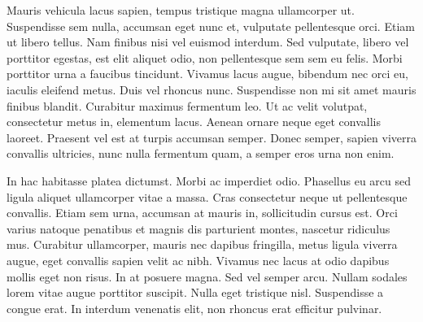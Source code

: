 \documentclass{article}
\begin{document}
Mauris vehicula lacus sapien, tempus tristique magna ullamcorper ut. Suspendisse sem nulla, accumsan eget nunc et, vulputate pellentesque orci. Etiam ut libero tellus. Nam finibus nisi vel euismod interdum. Sed vulputate, libero vel porttitor egestas, est elit aliquet odio, non pellentesque sem sem eu felis. Morbi porttitor urna a faucibus tincidunt. Vivamus lacus augue, bibendum nec orci eu, iaculis eleifend metus. Duis vel rhoncus nunc. Suspendisse non mi sit amet mauris finibus blandit. Curabitur maximus fermentum leo. Ut ac velit volutpat, consectetur metus in, elementum lacus. Aenean ornare neque eget convallis laoreet. Praesent vel est at turpis accumsan semper. Donec semper, sapien viverra convallis ultricies, nunc nulla fermentum quam, a semper eros urna non enim.

In hac habitasse platea dictumst. Morbi ac imperdiet odio. Phasellus eu arcu sed ligula aliquet ullamcorper vitae a massa. Cras consectetur neque ut pellentesque convallis. Etiam sem urna, accumsan at mauris in, sollicitudin cursus est. Orci varius natoque penatibus et magnis dis parturient montes, nascetur ridiculus mus. Curabitur ullamcorper, mauris nec dapibus fringilla, metus ligula viverra augue, eget convallis sapien velit ac nibh. Vivamus nec lacus at odio dapibus mollis eget non risus. In at posuere magna. Sed vel semper arcu. Nullam sodales lorem vitae augue porttitor suscipit. Nulla eget tristique nisl. Suspendisse a congue erat. In interdum venenatis elit, non rhoncus erat efficitur pulvinar.
\end{document}
